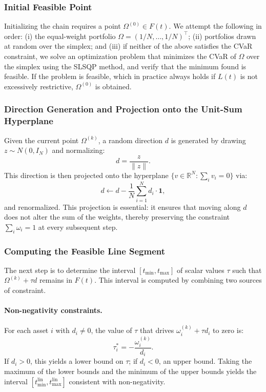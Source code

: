 \subsubsection{Initial Feasible Point}

Initializing the chain requires a point $\Omega^{(0)} \in F(t)$. We attempt the following in order: (i) the equal-weight portfolio $\Omega=(1/N,\ldots,1/N)^{\top}$; (ii) portfolios drawn at random over the simplex; and (iii) if neither of the above satisfies the CVaR constraint, we solve an optimization problem that minimizes the CVaR of $\Omega$ over the simplex using the SLSQP method, and verify that the minimum found is feasible. If the problem is feasible, which in practice always holds if $L(t)$ is not excessively restrictive, $\Omega^{(0)}$ is obtained.

\subsubsection{Direction Generation and Projection onto the Unit-Sum Hyperplane}

Given the current point $\Omega^{(k)}$, a random direction $d$ is generated by drawing $z \sim N(0,I_N)$ and normalizing:
\begin{equation}
d=\frac{z}{\lVert z\rVert}.
\end{equation}
This direction is then projected onto the hyperplane $\{v \in \mathbb{R}^{N}:\sum_i v_i=0\}$ via:
\begin{equation}
d \leftarrow d - \frac{1}{N}\sum_{i=1}^{N}d_i \cdot \mathbf{1},
\end{equation}
and renormalized. This projection is essential: it ensures that moving along $d$ does not alter the sum of the weights, thereby preserving the constraint $\sum_i \omega_i=1$ at every subsequent step.

\subsubsection{Computing the Feasible Line Segment}

The next step is to determine the interval $[t_{\min},t_{\max}]$ of scalar values $\tau$ such that $\Omega^{(k)}+\tau d$ remains in $F(t)$. This interval is computed by combining two sources of constraint.

\paragraph{Non-negativity constraints.}
For each asset $i$ with $d_i \neq 0$, the value of $\tau$ that drives $\omega_i^{(k)}+\tau d_i$ to zero is:
\begin{equation}
\tau_i^{*}=-\frac{\omega_i^{(k)}}{d_i}.
\end{equation}
If $d_i>0$, this yields a lower bound on $\tau$; if $d_i<0$, an upper bound. Taking the maximum of the lower bounds and the minimum of the upper bounds yields the interval $[t_{\min}^{\mathrm{lin}},t_{\max}^{\mathrm{lin}}]$ consistent with non-negativity.

